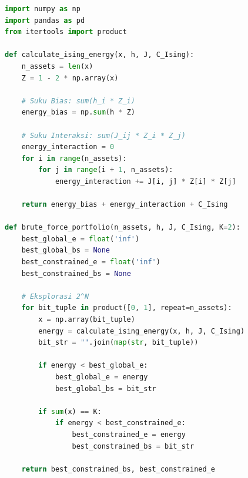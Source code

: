 \begin{lstlisting}[language=Python, caption={Skrip komputasi algoritma \textit{brute force} untuk validasi lanskap energi portofolio pada arsitektur kuantum}, label={lst:brute_force_code}]
import numpy as np
import pandas as pd
from itertools import product

def calculate_ising_energy(x, h, J, C_Ising):
    n_assets = len(x)
    Z = 1 - 2 * np.array(x)
    
    # Suku Bias: sum(h_i * Z_i)
    energy_bias = np.sum(h * Z)
    
    # Suku Interaksi: sum(J_ij * Z_i * Z_j)
    energy_interaction = 0
    for i in range(n_assets):
        for j in range(i + 1, n_assets):
            energy_interaction += J[i, j] * Z[i] * Z[j]
            
    return energy_bias + energy_interaction + C_Ising

def brute_force_portfolio(n_assets, h, J, C_Ising, K=2):
    best_global_e = float('inf')
    best_global_bs = None
    best_constrained_e = float('inf')
    best_constrained_bs = None
    
    # Eksplorasi 2^N
    for bit_tuple in product([0, 1], repeat=n_assets):
        x = np.array(bit_tuple)
        energy = calculate_ising_energy(x, h, J, C_Ising)
        bit_str = "".join(map(str, bit_tuple))
        
        if energy < best_global_e:
            best_global_e = energy
            best_global_bs = bit_str
            
        if sum(x) == K:
            if energy < best_constrained_e:
                best_constrained_e = energy
                best_constrained_bs = bit_str
                
    return best_constrained_bs, best_constrained_e
\end{lstlisting}
